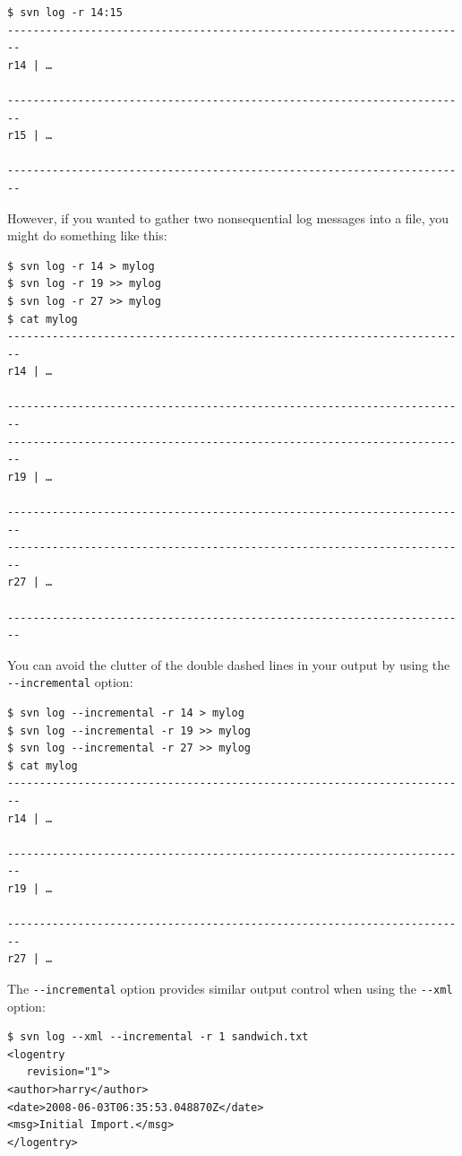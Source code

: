 \begin{verbatim}
$ svn log -r 14:15
------------------------------------------------------------------------
r14 | …

------------------------------------------------------------------------
r15 | …

------------------------------------------------------------------------
\end{verbatim}

However, if you wanted to gather two nonsequential log messages into a
file, you might do something like this:

\begin{verbatim}
$ svn log -r 14 > mylog
$ svn log -r 19 >> mylog
$ svn log -r 27 >> mylog
$ cat mylog
------------------------------------------------------------------------
r14 | …

------------------------------------------------------------------------
------------------------------------------------------------------------
r19 | …

------------------------------------------------------------------------
------------------------------------------------------------------------
r27 | …

------------------------------------------------------------------------
\end{verbatim}

You can avoid the clutter of the double dashed lines in your output by
using the \texttt{-\/-incremental} option:

\begin{verbatim}
$ svn log --incremental -r 14 > mylog
$ svn log --incremental -r 19 >> mylog
$ svn log --incremental -r 27 >> mylog
$ cat mylog
------------------------------------------------------------------------
r14 | …

------------------------------------------------------------------------
r19 | …

------------------------------------------------------------------------
r27 | …
\end{verbatim}

The \texttt{-\/-incremental} option provides similar output control when
using the \texttt{-\/-xml} option:

\begin{verbatim}
$ svn log --xml --incremental -r 1 sandwich.txt
<logentry
   revision="1">
<author>harry</author>
<date>2008-06-03T06:35:53.048870Z</date>
<msg>Initial Import.</msg>
</logentry>
\end{verbatim}

